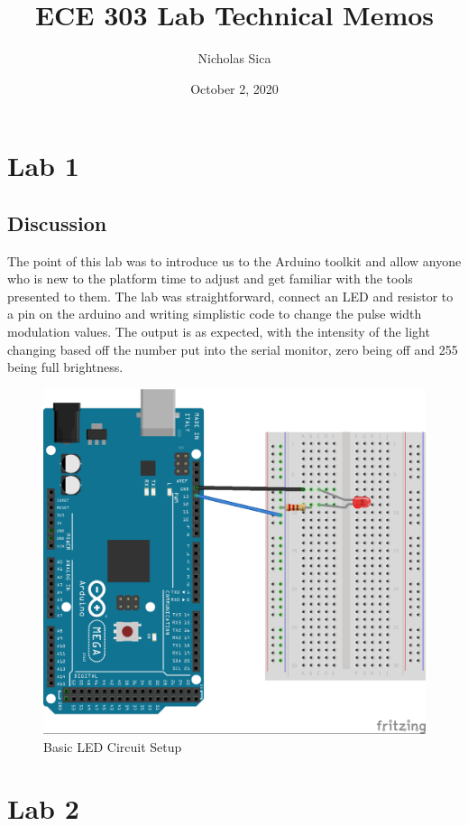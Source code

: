 \documentclass[12pt,titlepage]{article}
\begin{document}
\title{ECE 303 Lab Technical Memos}
\author{Nicholas Sica}
\date{October 2, 2020}
\maketitle

\tableofcontents
\newpage

\section{Lab 1}
\subsection{Discussion}
The point of this lab was to introduce us to the Arduino toolkit and allow anyone who is new to the platform
time to adjust and get familiar with the tools presented to them. The lab was straightforward, connect an LED
and resistor to a pin on the arduino and writing simplistic code to change the pulse width modulation values.
The output is as expected, with the intensity of the light changing based off the number put into the serial
monitor, zero being off and 255 being full brightness.
\begin{figure}[!htb]
  \centering
  \includegraphics[width=5.0in]{lab_1/schematic.png}
  \caption{Basic LED Circuit Setup}\label{fig:lab_1}
\end{figure}
\newpage

\section{Lab 2}
\end{document}
